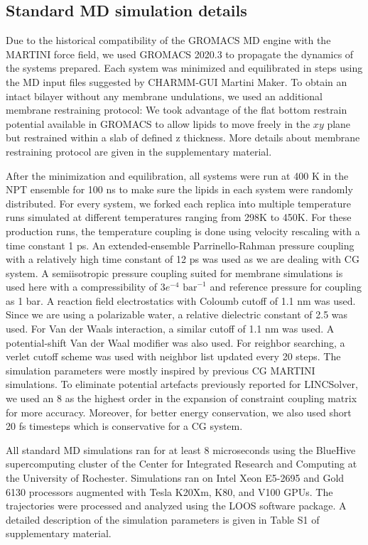 \documentclass{biophys-new}
\begin{document}
\subsection*{Standard MD simulation details}

Due to the historical compatibility of the GROMACS MD engine with the MARTINI force field, we used GROMACS 2020.3\cite{Abraham2015} to propagate the dynamics of the systems prepared. 
Each system was minimized and equilibrated in steps using the MD input files suggested by CHARMM-GUI Martini Maker.
To obtain an intact bilayer without any membrane undulations, we used an additional membrane restraining protocol: 
We took advantage of the flat bottom restrain potential available in GROMACS to allow lipids to move freely in the $xy$ plane but restrained within a slab of defined z thickness.
More details about membrane restraining protocol are given in the supplementary material.

After the minimization and equilibration, all systems were run at 400 K in the NPT ensemble for 100 ns to make sure the lipids in each system were randomly distributed.
For every system, we forked each replica into multiple temperature runs simulated at different temperatures ranging from 298K to 450K.
For these production runs, the temperature coupling is done using velocity rescaling with a time constant 1 ps.
An extended-ensemble Parrinello-Rahman pressure coupling with a relatively high time constant of 12 ps was used as we are dealing with CG system. 
A semiisotropic pressure coupling suited for membrane simulations is used here with a compressibility of $3e^{-4}$ $\text{bar}^{-1}$ and reference pressure for coupling as 1 bar.
A reaction field electrostatics with Coloumb cutoff of 1.1 nm was used.
Since we are using a polarizable water, a relative dielectric constant of 2.5 was used.
For Van der Waals interaction, a similar cutoff of 1.1 nm was used.
A potential-shift Van der Waal modifier was also used.
For reighbor searching, a verlet cutoff scheme was used with neighbor list updated every 20 steps.
The simulation parameters were mostly inspired by previous CG MARTINI simulations\cite{DeJong2016}. 
To eliminate potential artefacts previously reported\cite{Javanainen2020} for LINCSolver, we used an 8 as the highest order in the expansion of constraint coupling matrix for more accuracy.
Moreover, for better energy conservation, we also used short 20 fs timesteps which is conservative for a CG system.

All standard MD simulations ran for at least 8 microseconds using the BlueHive supercomputing cluster of the Center for Integrated Research and Computing at the University of Rochester.
Simulations ran on Intel Xeon E5-2695 and Gold 6130 processors augmented with Tesla K20Xm, K80, and V100 GPUs.   
The trajectories were processed and analyzed using the LOOS software package.
A detailed description of the simulation parameters is given in Table S1 of supplementary material. 
\end{document}
